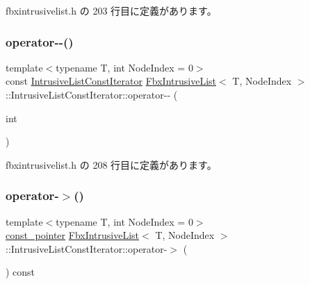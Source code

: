  fbxintrusivelist.\+h の 203 行目に定義があります。

\mbox{\label{class_fbx_intrusive_list_1_1_intrusive_list_const_iterator_a6db71090bf31cdb269e9e8d0c8e3b30c}} 
\subsubsection{\texorpdfstring{operator-\/-\/()}{operator--()}\hspace{0.1cm}{\footnotesize\ttfamily [2/2]}}
{\footnotesize\ttfamily template$<$typename T, int Node\+Index = 0$>$ \\
const \hyperlink{class_fbx_intrusive_list_1_1_intrusive_list_const_iterator}{Intrusive\+List\+Const\+Iterator} \hyperlink{class_fbx_intrusive_list}{Fbx\+Intrusive\+List}$<$ T, Node\+Index $>$\+::Intrusive\+List\+Const\+Iterator\+::operator-\/-\/ (\begin{DoxyParamCaption}\item[{int}]{ }\end{DoxyParamCaption})\hspace{0.3cm}{\ttfamily [inline]}}



 fbxintrusivelist.\+h の 208 行目に定義があります。

\mbox{\label{class_fbx_intrusive_list_1_1_intrusive_list_const_iterator_aab8544db3196fab85a8f7b8198fe7c81}} 
\subsubsection{\texorpdfstring{operator-\/$>$()}{operator->()}}
{\footnotesize\ttfamily template$<$typename T, int Node\+Index = 0$>$ \\
\hyperlink{class_fbx_intrusive_list_ae8232fd6a6ef678e5d5eed6ad978994c}{const\+\_\+pointer} \hyperlink{class_fbx_intrusive_list}{Fbx\+Intrusive\+List}$<$ T, Node\+Index $>$\+::Intrusive\+List\+Const\+Iterator\+::operator-\/$>$ (\begin{DoxyParamCaption}{ }\end{DoxyParamCaption}) const\hspace{0.3cm}{\ttfamily [inline]}}



